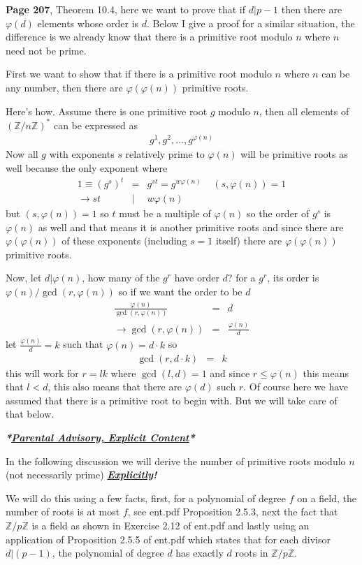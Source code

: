 \documentclass[aps,preprint,preprintnumbers,nofootinbib,showpacs,prd]{revtex4-1}
\newcommand{\nbea}{\begin{eqnarray*}}
\newcommand{\neea}{\end{eqnarray*}}
\begin{document}
{\bf Page 207}, Theorem 10.4, here we want to prove that if $d|p-1$ then there are $\varphi(d)$ elements whose order is $d$. Below I give a proof for a similar situation, the difference is we already know that there is a primitive root modulo $n$ where $n$ need not be prime.

First we want to show that if there is a primitive root modulo $n$ where $n$ can be any number, then there are $\varphi(\varphi(n))$ primitive roots.

Here's how. Assume there is one primitive root $g$ modulo $n$, then all elements of $(\mathbb{Z}/n\mathbb{Z})^*$ can be expressed as
%
\nbea
g^1, g^2 ,\dots, g^{\varphi(n)}
\neea
%
Now all $g$ with exponents $s$ relatively prime to $\varphi(n)$ will be primitive roots as well because the only exponent where
%
\nbea
1 \equiv (g^s)^t & = & g^{st} = g^{w\varphi(n)} ~~~~~ (s,\varphi(n)) = 1 \\
\to st &|& w\varphi(n)
\neea
%
but $(s,\varphi(n)) = 1$ so $t$ must be a multiple of $\varphi(n)$ so the order of $g^s$ is $\varphi(n)$ as well and that means it is another primitive roots and since there are $\varphi(\varphi(n))$ of these exponents (including $s=1$ itself) there are $\varphi(\varphi(n))$ primitive roots.

Now, let $d|\varphi(n)$, how many of the $g^r$ have order $d$? for a $g^r$, its order is $\varphi(n)/\gcd(r,\varphi(n))$ so if we want the order to be $d$
%
\nbea
\frac{\varphi(n)}{\gcd(r,\varphi(n))} & = & d \\
\to \gcd(r,\varphi(n)) & = & \frac{\varphi(n)}{d}
\neea
%
let $\frac{\varphi(n)}{d} = k$ such that $\varphi(n) = d\cdot k$ so
%
\nbea
\gcd(r,d\cdot k) & = & k
\neea
%
this will work for $r = lk$ where $\gcd(l,d) = 1$ and since $r \le \varphi(n)$ this means that $l < d$, this also means that there are $\varphi(d)$ such $r$. Of course here we have assumed that there is a primitive root to begin with. But we will take care of that below.

\textbf{\textit{*}}\underline{\textit{\textbf {Parental Advisory, Explicit Content}}}\textbf{\textit{*}}

In the following discussion we will derive the number of primitive roots modulo $n$ (not necessarily prime) \underline{\textbf{\textit{Explicitly}}}\textbf{\textit{!}}

We will do this using a few facts, first, for a polynomial of degree $f$ on a field, the number of roots is at most $f$, see ent.pdf Proposition 2.5.3, next the fact that $\mathbb{Z}/p\mathbb{Z}$ is a field as shown in Exercise 2.12 of ent.pdf and lastly using an application of Proposition 2.5.5 of ent.pdf which states that for each divisor $d|(p-1)$, the polynomial of degree $d$ has exactly $d$ roots in $\mathbb{Z}/p\mathbb{Z}$.
\end{document}
